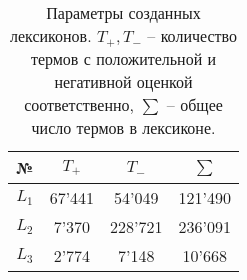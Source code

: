 \begin{table}[ht!]
\centering
\caption{Параметры созданных лексиконов.
    $T_+, T_-$ -- количество термов с положительной и негативной оценкой
    соответственно,
    $\sum$ -- общее число термов в лексиконе.}
\label{table:createdLexicons}
\begin{tabular}{cccc}
\hline
№        & $T_+$  & $T_-$   & $\sum$  \\ \hline
$L_1$    & 67'441 & 54'049  & 121'490 \\
$L_2$    & 7'370  & 228'721 & 236'091 \\
$L_3$    & 2'774  & 7'148   & 10'668  \\ \hline
\end{tabular}
\end{table}
